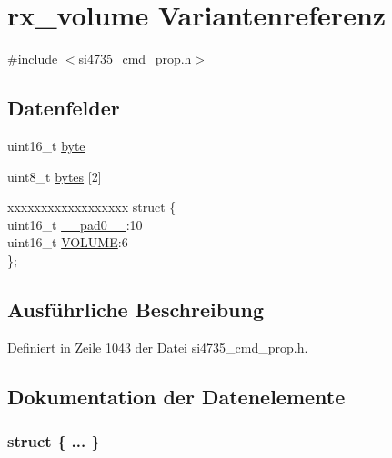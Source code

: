 \hypertarget{unionrx__volume}{}\section{rx\+\_\+volume Variantenreferenz}
\label{unionrx__volume}


{\ttfamily \#include $<$si4735\+\_\+cmd\+\_\+prop.\+h$>$}

\subsection*{Datenfelder}
\begin{DoxyCompactItemize}
\item 
uint16\+\_\+t \hyperlink{unionrx__volume_ab0549c1b5ea980a02e7eab77e21fea49}{byte}
\item 
uint8\+\_\+t \hyperlink{unionrx__volume_a46e4c05d20a047ec169f60d3167e912e}{bytes} \mbox{[}2\mbox{]}
\item 
\begin{tabbing}
xx\=xx\=xx\=xx\=xx\=xx\=xx\=xx\=xx\=\kill
struct \{\\
\>uint16\_t \hyperlink{unionrx__volume_a77132c2c26a75f5b8751b235cda23828}{\_\_pad0\_\_}:10\\
\>uint16\_t \hyperlink{unionrx__volume_a03739146af570e536bfcb72ec21ffee9}{VOLUME}:6\\
\}; \\

\end{tabbing}\end{DoxyCompactItemize}


\subsection{Ausführliche Beschreibung}


Definiert in Zeile 1043 der Datei si4735\+\_\+cmd\+\_\+prop.\+h.



\subsection{Dokumentation der Datenelemente}
\hypertarget{unionrx__volume_a835c10068d0c39aad72ac3320be819d4}{}\subsubsection[{"@127}]{\setlength{\rightskip}{0pt plus 5cm}struct \{ ... \} }\label{unionrx__volume_a835c10068d0c39aad72ac3320be819d4}
\hypertarget{unionrx__volume_a77132c2c26a75f5b8751b235cda23828}{}
